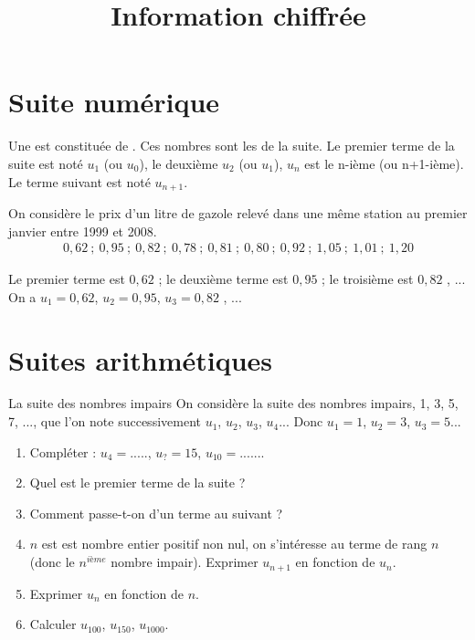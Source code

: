 \documentclass[12pt,a4paper]{article}
\date{}
\title{Information chiffrée }
\begin{document}




\section{Suite numérique}

\begin{mydef}
	Une  est constituée de . Ces nombres sont les  de la suite. Le premier terme de la suite est noté $u_1$ (ou $u_0$), le deuxième $u_2$ (ou $u_1$), $u_n$ est le n-ième (ou n+1-ième). Le terme suivant est noté $u_{n+1}$.
	
\end{mydef}

\begin{myex}
	On considère le prix d'un litre de gazole relevé dans une même station au premier janvier entre 1999 et 2008.
	\begin{align*}
		0,62 \:;\: 0,95 \:;\: 0,82 \:; \:0,78 \:;\: 0,81 \:;\: 0,80 \:;\: 0,92 \:;\: 1,05 \:;\: 1,01 \:; \:1,20
	\end{align*}
	
	Le premier terme est $0,62$ ; le deuxième terme est $0,95$ ; le troisième est $0,82$ , ...
	On a
	$u_1=0,62$, $u_2=0,95$, $u_3=0,82$ , ...
\end{myex}

\section{Suites arithmétiques}


\begin{myact}{La suite des nombres impairs}
	On considère la suite des nombres impairs, 1, 3, 5, 7, ..., que l'on note successivement $u_1$, $u_2$, $u_3$, $u_4$...
	Donc $u_1=1$, $u_2=3$, $u_3=5$...\\
	
	\begin{enumerate}
		\item Compléter : $u_4=.....$, $u_? =15$, $u_{10}=......$.
		\item Quel est le premier terme de la suite ?
		\item Comment passe-t-on d'un terme au suivant ?
		\item $n$ est est nombre entier positif non nul, on s'intéresse au terme de rang $n$ (donc le $n^{ième}$ nombre impair). Exprimer $u_{n+1}$ en fonction de $u_n$.
		\item Exprimer $u_n$ en fonction de $n$.
		\item Calculer $u_{100}$, $u_{150}$, $u_{1000}$.
	\end{enumerate}
	
\end{myact}
\end{document}
